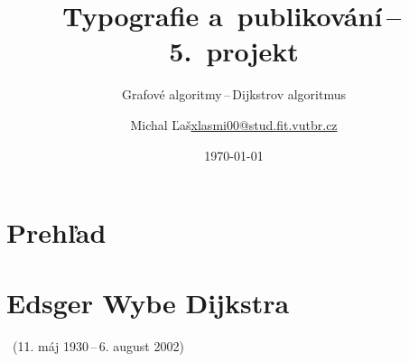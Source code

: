 \documentclass{beamer}
\title{Typografie a~publikování\,--\,5.~projekt}
\subtitle{Grafové algoritmy\,--\,Dijkstrov algoritmus}
\author{\texorpdfstring{Michal Ľaš\newline\url{xlasmi00@stud.fit.vutbr.cz}}{Michal Ľaš}}
\institute
{
	Vysoké učení technické v~Brně\\
	Fakulta informačních technologií
}
\date{\today}
\begin{document}
\frame{\titlepage}

\section{Prehľad}

\begin{frame}{\insertsectionhead}
	\tableofcontents
\end{frame}

\section{Edsger Wybe Dijkstra}

\begin{frame}[c]{\insertsectionhead~(11. máj 1930\,--\,6. august 2002)}
	\begin{columns}[T]
		\begin{column}{0.5\textwidth}
			\begin{figure}
				\centering
			\end{figure}
		\end{column}


\end{columns}
\end{frame}
\end{document}
